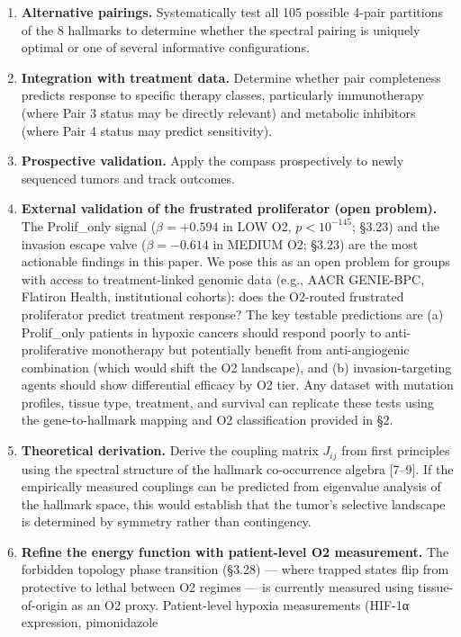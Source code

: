 \documentclass[
  11pt,
]{article}
\begin{document}
\begin{enumerate}
\item
  \textbf{Alternative pairings.} Systematically test all 105 possible
  4-pair partitions of the 8 hallmarks to determine whether the spectral
  pairing is uniquely optimal or one of several informative
  configurations.
\item
  \textbf{Integration with treatment data.} Determine whether pair
  completeness predicts response to specific therapy classes,
  particularly immunotherapy (where Pair 3 status may be directly
  relevant) and metabolic inhibitors (where Pair 4 status may predict
  sensitivity).
\item
  \textbf{Prospective validation.} Apply the compass prospectively to
  newly sequenced tumors and track outcomes.
\item
  \textbf{External validation of the frustrated proliferator (open
  problem).} The Prolif\_only signal (\(\beta = +0.594\) in LOW O2,
  \(p < 10^{-145}\); §3.23) and the invasion escape valve
  (\(\beta = -0.614\) in MEDIUM O2; §3.23) are the most actionable
  findings in this paper. We pose this as an open problem for groups
  with access to treatment-linked genomic data (e.g., AACR GENIE-BPC,
  Flatiron Health, institutional cohorts): does the O2-routed frustrated
  proliferator predict treatment response? The key testable predictions
  are (a) Prolif\_only patients in hypoxic cancers should respond poorly
  to anti-proliferative monotherapy but potentially benefit from
  anti-angiogenic combination (which would shift the O2 landscape), and
  (b) invasion-targeting agents should show differential efficacy by O2
  tier. Any dataset with mutation profiles, tissue type, treatment, and
  survival can replicate these tests using the gene-to-hallmark mapping
  and O2 classification provided in §2.
\item
  \textbf{Theoretical derivation.} Derive the coupling matrix \(J_{ij}\)
  from first principles using the spectral structure of the hallmark
  co-occurrence algebra {[}7--9{]}. If the empirically measured
  couplings can be predicted from eigenvalue analysis of the hallmark
  space, this would establish that the tumor's selective landscape is
  determined by symmetry rather than contingency.
\item
  \textbf{Refine the energy function with patient-level O2 measurement.}
  The forbidden topology phase transition (§3.28) --- where trapped
  states flip from protective to lethal between O2 regimes --- is
  currently measured using tissue-of-origin as an O2 proxy.
  Patient-level hypoxia measurements (HIF-1α expression, pimonidazole

\end{enumerate}
\end{document}
